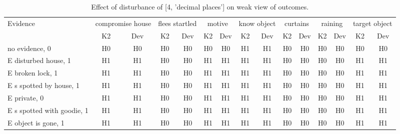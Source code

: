 \begin{table}\begin{tabular}{l|cc|cc|cc|cc|cc|cc|cc}\toprule\multirow{2}{*}{Evidence} & \multicolumn{2}{c}{compromise house}& \multicolumn{2}{c}{flees startled}& \multicolumn{2}{c}{motive}& \multicolumn{2}{c}{know object}& \multicolumn{2}{c}{curtains}& \multicolumn{2}{c}{raining}& \multicolumn{2}{c}{target object}\\& {K2} & {Dev}& {K2} & {Dev}& {K2} & {Dev}& {K2} & {Dev}& {K2} & {Dev}& {K2} & {Dev}& {K2} & {Dev}\\\midrule
no evidence, 0 & H0&H0&H0&H0&H0&H0&H1&H1&H0&H0&H0&H0&H0&H0\\E disturbed house, 1 & H1&H1&H0&H0&H1&H1&H1&H1&H0&H0&H0&H0&H1&H1\\E broken lock, 1 & H1&H1&H0&H0&H1&H1&H1&H1&H0&H0&H0&H0&H1&H1\\E s spotted by house, 1 & H1&H1&H0&H0&H1&H1&H1&H1&H0&H0&H0&H0&H1&H1\\E private, 0 & H1&H1&H0&H0&H1&H1&H1&H1&H0&H0&H0&H0&H1&H1\\E s spotted with goodie, 1 & H1&H1&H0&H0&H1&H1&H1&H1&H0&H0&H0&H0&H1&H1\\E object is gone, 1 & H1&H1&H0&H0&H1&H1&H1&H1&H0&H0&H0&H0&H1&H1\\\bottomrule\end{tabular}\caption{Effect of disturbance of [4, 'decimal places'] on weak view of outcomes.}\end{table}